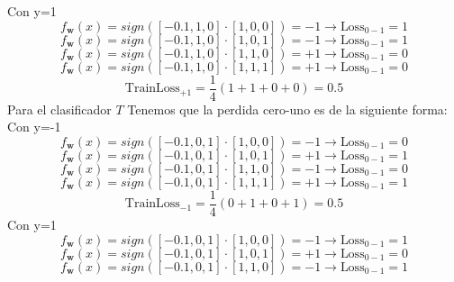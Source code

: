 \documentclass[14pt,a4paper]{report}
\begin{document}
	Con y=1
	\begin{equation*}
		f_{\textbf{w}}(x)=sign([-0.1,1,0]\cdot[1,0,0])=-1\rightarrow
		\text{Loss}_{0-1}=1
	\end{equation*}
	\begin{equation*}
		f_{\textbf{w}}(x)=sign([-0.1,1,0]\cdot[1,0,1])=-1\rightarrow
		\text{Loss}_{0-1}=1
	\end{equation*}
	\begin{equation*}
		f_{\textbf{w}}(x)=sign([-0.1,1,0]\cdot[1,1,0])=+1\rightarrow
		\text{Loss}_{0-1}=0
	\end{equation*}
		\begin{equation*}
		f_{\textbf{w}}(x)=sign([-0.1,1,0]\cdot[1,1,1])=+1\rightarrow
		\text{Loss}_{0-1}=0
	\end{equation*}
	\begin{equation*}
		\text{TrainLoss}_{+1}=\frac{1}{4}(1+1+0+0)=0.5
	\end{equation*}
Para el clasificador $T$
Tenemos que la perdida cero-uno es de la siguiente forma:
	Con y=-1
	\begin{equation*}
		f_{\textbf{w}}(x)=sign([-0.1,0,1]\cdot[1,0,0])=-1\rightarrow
		\text{Loss}_{0-1}=0
	\end{equation*}
	\begin{equation*}
		f_{\textbf{w}}(x)=sign([-0.1,0,1]\cdot[1,0,1])=+1\rightarrow
		\text{Loss}_{0-1}=1
	\end{equation*}
	\begin{equation*}
		f_{\textbf{w}}(x)=sign([-0.1,0,1]\cdot[1,1,0])=-1\rightarrow
		\text{Loss}_{0-1}=0
	\end{equation*}
		\begin{equation*}
		f_{\textbf{w}}(x)=sign([-0.1,0,1]\cdot[1,1,1])=+1\rightarrow
		\text{Loss}_{0-1}=1
	\end{equation*}
	\begin{equation*}
		\text{TrainLoss}_{-1}=\frac{1}{4}(0+1+0+1)=0.5
	\end{equation*}
	Con y=1
	\begin{equation*}
		f_{\textbf{w}}(x)=sign([-0.1,0,1]\cdot[1,0,0])=-1\rightarrow
		\text{Loss}_{0-1}=1
	\end{equation*}
	\begin{equation*}
		f_{\textbf{w}}(x)=sign([-0.1,0,1]\cdot[1,0,1])=+1\rightarrow
		\text{Loss}_{0-1}=0
	\end{equation*}
	\begin{equation*}
		f_{\textbf{w}}(x)=sign([-0.1,0,1]\cdot[1,1,0])=-1\rightarrow
		\text{Loss}_{0-1}=1
	\end{equation*}
\end{document}
